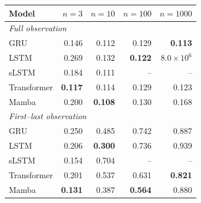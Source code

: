 \begin{tabular}{lrrrr}
\toprule
Model & $n{=}3$ & $n{=}10$ & $n{=}100$ & $n{=}1000$ \\
\midrule
\multicolumn{5}{l}{\emph{Full observation}} \\
GRU & 0.146 & 0.112 & 0.129 & \textbf{0.113} \\
LSTM & 0.269 & 0.132 & \textbf{0.122} & $8.0\!\times\!10^{6}$ \\
sLSTM & 0.184 & 0.111 & -- & -- \\
Transformer & \textbf{0.117} & 0.114 & 0.129 & 0.123 \\
Mamba & 0.200 & \textbf{0.108} & 0.130 & 0.168 \\
\midrule
\multicolumn{5}{l}{\emph{First--last observation}} \\
GRU & 0.250 & 0.485 & 0.742 & 0.887 \\
LSTM & 0.206 & \textbf{0.300} & 0.736 & 0.939 \\
sLSTM & 0.154 & 0.704 & -- & -- \\
Transformer & 0.201 & 0.537 & 0.631 & \textbf{0.821} \\
Mamba & \textbf{0.131} & 0.387 & \textbf{0.564} & 0.880 \\
\bottomrule
\end{tabular}
